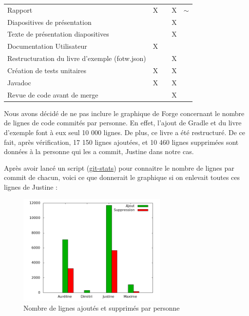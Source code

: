 \begin{centering}
\begin{longtable}{|p{8cm}|c|c|c|c|}
				\rowcolor{lightgray} \multicolumn{5}{|c|}{ \textbf{Autre}}\\
				\hline
				Rapport & X & & X & $\sim$\\
				\hline
				Diapositives de présentation & & & X &\\
				\hline
				Texte de présentation diapositives & & & X &\\
				\hline
				Documentation Utilisateur & X & & &\\
				\hline
				Restructuration du livre d'exemple (fotw.json) & & & X & \\
				\hline
				Création de tests unitaires & X & & X & \\
				\hline
				Javadoc & X & & X & \\
				\hline
				Revue de code avant de merge & & & X & \\
				\hline
			\end{longtable}
		\end{centering}

		Nous avons décidé de ne pas inclure le graphique de Forge concernant le nombre de lignes de code commités par personne. En effet, l'ajout de Gradle et du livre d'exemple font à eux seul 10 000 lignes. De plus, ce livre a été restructuré. De ce fait, après vérification, 17 150 lignes ajoutées, et 10 460 lignes supprimées sont données à la personne qui les a commit, Justine dans notre cas.

		Après avoir lancé un script (\href{https://gist.github.com/jmartin-pro/64059d16f659421d3ddf3cd43ba75e50}{git-stats}) pour connaitre le nombre de lignes par commit de chacun, voici ce que donnerait le graphique si on enlevait toutes ces lignes de Justine :

		\begin{figure}[H]
			\centering\includegraphics[width=0.66\textwidth, keepaspectratio]{img/repo_stats.png}
			\caption{Nombre de lignes ajoutés et supprimés par personne}
		\end{figure}

